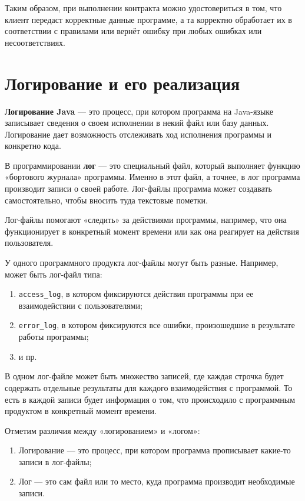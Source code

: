 Таким образом, при выполнении контракта можно удостовериться в том, что клиент передаст корректные данные программе, а та корректно обработает их в соответствии с правилами или вернёт ошибку при любых ошибках или несоответствиях.

\section{Логирование и его реализация}

\textbf{Логирование Java} — это процесс, при котором программа на Java-языке записывает сведения о своем исполнении в некий файл или базу данных. Логирование дает возможность отслеживать ход исполнения программы и конкретно кода.

В программировании \textbf{лог} — это специальный файл, который выполняет функцию «бортового журнала» программы. Именно в этот файл, а точнее, в лог программа производит записи о своей работе. Лог-файлы программа может создавать самостоятельно, чтобы вносить туда текстовые пометки.

Лог-файлы помогают «следить» за действиями программы, например, что она функционирует в конкретный момент времени или как она реагирует на действия пользователя.

У одного программного продукта лог-файлы могут быть разные. Например, может быть лог-файл типа:

\begin{enumerate}
    \item \verb|access_log|, в котором фиксируются действия программы при ее взаимодействии с пользователями;
    \item \verb|error_log|, в котором фиксируются все ошибки, произошедшие в результате работы программы;
    \item и пр.
\end{enumerate}

В одном лог-файле может быть множество записей, где каждая строчка будет содержать отдельные результаты для каждого взаимодействия с программой. То есть в каждой записи будет информация о том, что происходило с программным продуктом в конкретный момент времени.

Отметим различия между «логированием» и «логом»:

\begin{enumerate}
    \item Логирование — это процесс, при котором программа прописывает какие-то записи в лог-файлы;
    \item Лог — это сам файл или то место, куда программа производит необходимые записи.
\end{enumerate}

